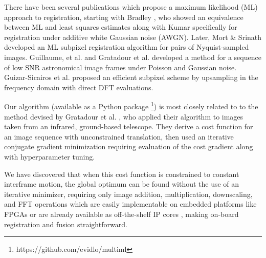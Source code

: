 \documentclass{article}
\begin{document}

There have been several publications which propose a maximum likelihood (ML) approach to registration, starting with Bradley \cite{bradley1973equivalence}, who showed an equivalence between ML and least squares estimates along with Kumar \cite{kumar1992correlation} specifically for registration under additive white Gaussian noise (AWGN).  Later, Mort \& Srinath \cite{mort1988maximum} developed an ML subpixel registration algorithm for pairs of Nyquist-sampled images.  Guillaume, et al. \cite{guillaume1998maximum} and Gratadour et al. \cite{gratadour2005sub} developed a method for a sequence of low SNR astronomical image frames under Poisson and Gaussian noise.
Guizar-Sicairos et al. \cite{guizar2008efficient} proposed an efficient subpixel scheme by upsampling in the frequency domain with direct DFT evaluations.

Our algorithm (available as a Python package \footnote{https://github.com/evidlo/multiml}) is most closely related to to the method devised by Gratadour et al. \cite{gratadour2005sub}, who applied their algorithm to images taken from an infrared, ground-based telescope.  They derive a cost function for an image sequence with unconstrained translation, then used an iterative conjugate gradient minimization requiring evaluation of the cost gradient along with hyperparameter tuning.

We have discovered that when this cost function is constrained to constant interframe motion, the global optimum can be found without the use of an iterative minimizer, requiring only image addition, multiplication, downscaling, and FFT operations which are easily implementable on embedded platforms like FPGAs or are already available as off-the-shelf IP cores \cite{xilinx}, making on-board registration and fusion straightforward.

\end{document}
